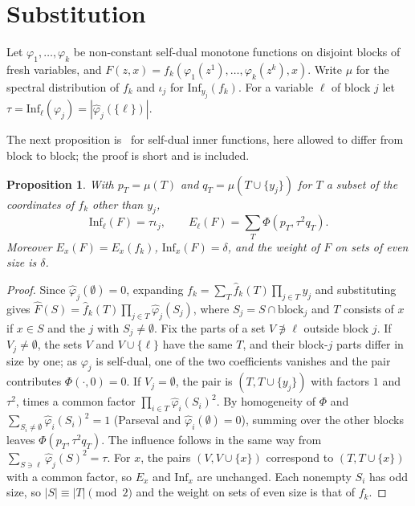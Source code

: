 \documentclass[11pt]{amsart}
\newtheorem{proposition}[theorem]{Proposition}
\theoremstyle{remark}
\newcommand{\Inf}{\mathrm{Inf}}
\begin{document}
\section{Substitution}\label{sec:subst}

Let $\varphi_1,\dots,\varphi_k$ be non-constant self-dual monotone functions on disjoint blocks of fresh variables, and
$F(z,x)=f_k(\varphi_1(z^1),\dots,\varphi_k(z^k),x)$. Write $\mu$ for the spectral distribution of $f_k$ and $\iota_j$
for $\Inf_{y_j}(f_k)$. For a variable $\ell$ of block $j$ let $\tau=\Inf_\ell(\varphi_j)=|\hat\varphi_j(\{\ell\})|$.

The next proposition is~\cite[Theorem~2.1]{Shm3} for self-dual inner functions, here allowed to differ from block to
block; the proof is short and is included.

\begin{proposition}\label{prop:leaf}
With $p_T=\mu(T)$ and $q_T=\mu(T\cup\{y_j\})$ for $T$ a subset of the coordinates of $f_k$ other than $y_j$,
\[
\Inf_\ell(F)=\tau\iota_j,\qquad E_\ell(F)=\sum_T\Phi(p_T,\tau^2q_T).
\]
Moreover $E_x(F)=E_x(f_k)$, $\Inf_x(F)=\delta$, and the weight of $F$ on sets of even size is $\delta$.
\end{proposition}

\begin{proof}
Since $\hat\varphi_j(\emptyset)=0$, expanding $f_k=\sum_T\hat f_k(T)\prod_{j\in T}y_j$ and substituting gives
$\hat F(S)=\hat f_k(T)\prod_{j\in T}\hat\varphi_j(S_j)$, where $S_j=S\cap\mathrm{block}_j$ and $T$ consists of $x$ if
$x\in S$ and the $j$ with $S_j\ne\emptyset$. Fix the parts of a set $V\not\ni\ell$ outside block $j$. If
$V_j\ne\emptyset$, the sets $V$ and $V\cup\{\ell\}$ have the same $T$, and their block-$j$ parts differ in size by one;
as $\varphi_j$ is self-dual, one of the two coefficients vanishes and the pair contributes $\Phi(\cdot,0)=0$. If
$V_j=\emptyset$, the pair is $(T,T\cup\{y_j\})$ with factors $1$ and $\tau^2$, times a common factor
$\prod_{i\in T}\hat\varphi_i(S_i)^2$. By homogeneity of $\Phi$ and $\sum_{S_i\ne\emptyset}\hat\varphi_i(S_i)^2=1$
(Parseval and $\hat\varphi_i(\emptyset)=0$), summing over the other blocks leaves $\Phi(p_T,\tau^2q_T)$. The influence
follows in the same way from $\sum_{S\ni\ell}\hat\varphi_j(S)^2=\tau$. For $x$, the pairs $(V,V\cup\{x\})$ correspond to
$(T,T\cup\{x\})$ with a common factor, so $E_x$ and $\Inf_x$ are unchanged. Each nonempty $S_i$ has odd size, so
$|S|\equiv|T|\pmod 2$ and the weight on sets of even size is that of $f_k$.
\end{proof}
\end{document}
